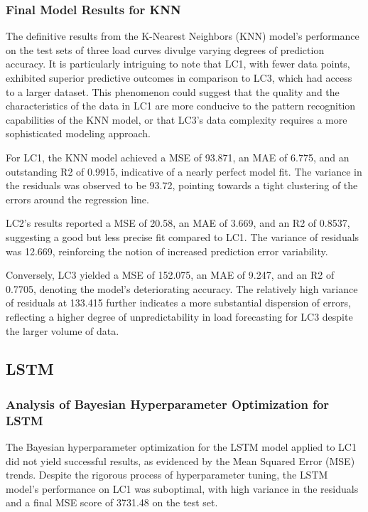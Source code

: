 \documentclass{article} %
\begin{document}
\subsubsection{Final Model Results for KNN}

The definitive results from the K-Nearest Neighbors (\gls{KNN}) model's performance on the test sets of three load curves divulge varying degrees of prediction accuracy. It is particularly intriguing to note that LC1, with fewer data points, exhibited superior predictive outcomes in comparison to LC3, which had access to a larger dataset. This phenomenon could suggest that the quality and the characteristics of the data in LC1 are more conducive to the pattern recognition capabilities of the \gls{KNN} model, or that LC3's data complexity requires a more sophisticated modeling approach.

For LC1, the \gls{KNN} model achieved a \gls{MSE} of 93.871, an \gls{MAE} of 6.775, and an outstanding \gls{R2} of 0.9915, indicative of a nearly perfect model fit. The variance in the residuals was observed to be 93.72, pointing towards a tight clustering of the errors around the regression line.

LC2's results reported a \gls{MSE} of 20.58, an \gls{MAE} of 3.669, and an \gls{R2} of 0.8537, suggesting a good but less precise fit compared to LC1. The variance of residuals was 12.669, reinforcing the notion of increased prediction error variability.

Conversely, LC3 yielded a \gls{MSE} of 152.075, an \gls{MAE} of 9.247, and an \gls{R2} of 0.7705, denoting the model's deteriorating accuracy. The relatively high variance of residuals at 133.415 further indicates a more substantial dispersion of errors, reflecting a higher degree of unpredictability in load forecasting for LC3 despite the larger volume of data.

\subsection{LSTM}
\subsubsection{Analysis of Bayesian Hyperparameter Optimization for LSTM}
The Bayesian hyperparameter optimization for the \gls{LSTM} model applied to \gls{LC1} did not yield successful results, as evidenced by the Mean Squared Error (MSE) trends. Despite the rigorous process of hyperparameter tuning, the \gls{LSTM} model's performance on \gls{LC1} was suboptimal, with high variance in the residuals and a final \gls{MSE} score of 3731.48 on the test set. 
\end{document}
